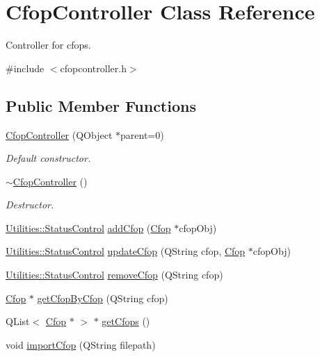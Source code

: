 \hypertarget{class_cfop_controller}{\section{\-Cfop\-Controller \-Class \-Reference}
\label{class_cfop_controller}
}


\-Controller for cfops.  




{\ttfamily \#include $<$cfopcontroller.\-h$>$}

\subsection*{\-Public \-Member \-Functions}
\begin{DoxyCompactItemize}
\item 
\hyperlink{class_cfop_controller_ad476efe95cbd9fc1589248251ef495cd}{\-Cfop\-Controller} (\-Q\-Object $\ast$parent=0)
\begin{DoxyCompactList}\small\item\em \-Default constructor. \end{DoxyCompactList}\item 
\hyperlink{class_cfop_controller_a2c820daab1042178f1b0738fdf840080}{$\sim$\-Cfop\-Controller} ()
\begin{DoxyCompactList}\small\item\em \-Destructor. \end{DoxyCompactList}\item 
\hyperlink{class_utilities_a2974f062d85bdb0c444a1cbe554bf228}{\-Utilities\-::\-Status\-Control} \hyperlink{class_cfop_controller_a81aa684f3893d57770c80a4b69e9a8bb}{add\-Cfop} (\hyperlink{class_cfop}{\-Cfop} $\ast$cfop\-Obj)
\item 
\hyperlink{class_utilities_a2974f062d85bdb0c444a1cbe554bf228}{\-Utilities\-::\-Status\-Control} \hyperlink{class_cfop_controller_a2cefd7e14f875750bb7beff692dbba9b}{update\-Cfop} (\-Q\-String cfop, \hyperlink{class_cfop}{\-Cfop} $\ast$cfop\-Obj)
\item 
\hyperlink{class_utilities_a2974f062d85bdb0c444a1cbe554bf228}{\-Utilities\-::\-Status\-Control} \hyperlink{class_cfop_controller_ad8ee3d4f9144dea569f2c008e975a4a8}{remove\-Cfop} (\-Q\-String cfop)
\item 
\hyperlink{class_cfop}{\-Cfop} $\ast$ \hyperlink{class_cfop_controller_a77a53797c307bc1ccc7fb280fd519970}{get\-Cfop\-By\-Cfop} (\-Q\-String cfop)
\item 
\-Q\-List$<$ \hyperlink{class_cfop}{\-Cfop} $\ast$ $>$ $\ast$ \hyperlink{class_cfop_controller_a6979e257fc570c0dc4919ca0880883af}{get\-Cfops} ()
\item 
void \hyperlink{class_cfop_controller_a4cb8ac7330a0063b5df99410088d7fb6}{import\-Cfop} (\-Q\-String filepath)
\end{DoxyCompactItemize}


